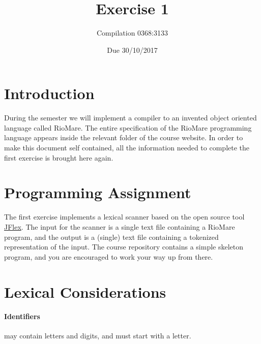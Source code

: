 \documentclass{article}
\begin{document}
\title{Exercise 1}

\author{Compilation 0368:3133}

\date{Due 30/10/2017}

\maketitle

\section{Introduction}
During the semester we will implement a compiler to an invented
object oriented language called RioMare.
The entire specification of the RioMare programming language
appears inside the relevant folder of the course website.
In order to make this document self contained,
all the information needed to complete the first exercise is brought here again.

\section{Programming Assignment}
The first exercise implements a lexical scanner based on the
open source tool \href{http://jflex.de/}{JFlex}.
The input for the scanner is a single text file containing a RioMare program,
and the output is a (single) text file containing a tokenized representation of the input.
The course repository contains a simple skeleton program,
and you are encouraged to work your way up from there.

\section{Lexical Considerations}
\paragraph{Identifiers} may contain letters and digits, and must start with a letter.
\end{document}
